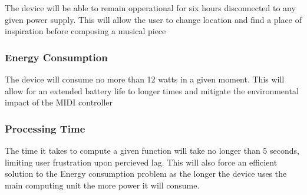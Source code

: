 The device will be able to remain opperational for six hours disconnected to any
given power supply. This will allow the user to change location and find a place
of inspiration before composing a musical piece

\subsubsection{Energy Consumption}

The device will consume no more than 12 watts in a given moment. This will allow
for an extended battery life to longer times and mitigate the environmental
impact of the MIDI controller

\subsubsection{Processing Time}

The time it takes to compute a given function will take no longer than 5
seconds, limiting user frustration upon percieved lag. This will also force an
efficient solution to the Energy consumption problem as the longer the device
uses the main computing unit the more power it will consume.
